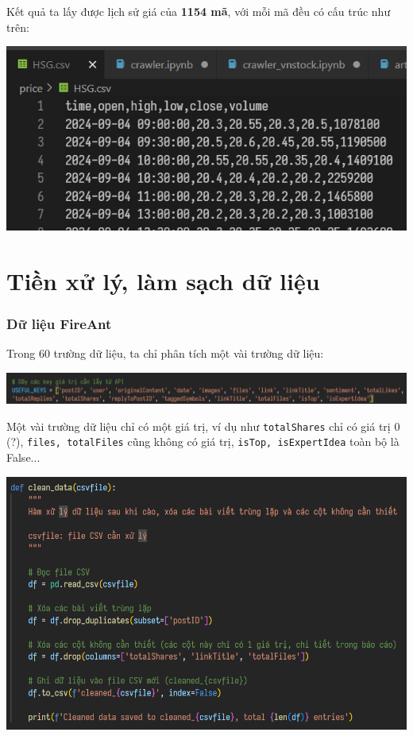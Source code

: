 Kết quả ta lấy được lịch sử giá của \textbf{1154 mã}, với mỗi mã đều có cấu trúc như trên:
\begin{center}
    \centering
    \includegraphics[width=0.6\linewidth]{images/code-1.18-crawlhistoryex.png}
\end{center}

\section{Tiền xử lý, làm sạch dữ liệu}
\subsubsection*{Dữ liệu FireAnt}
Trong 60 trường dữ liệu, ta chỉ phân tích một vài trường dữ liệu:
\begin{center}
    \centering
    \includegraphics[width=1\linewidth]{images/code-1.19-filter.png}
\end{center}

Một vài trường dữ liệu chỉ có một giá trị, ví dụ như \texttt{totalShares} chỉ có giá trị 0 (?), \texttt{files, totalFiles} cũng không có giá trị, \texttt{isTop, isExpertIdea} toàn bộ là False...

\begin{center}
    \centering
    \includegraphics[width=0.8\linewidth]{images/code-1.20-filterstep2.png}
\end{center}

